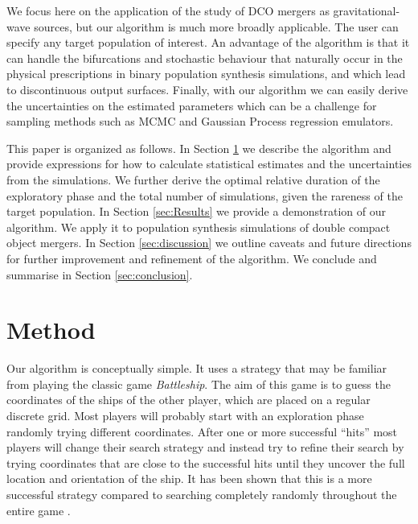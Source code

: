 \documentclass[a4paper,fleqn,usenatbib,useAMS,usedcolumn]{mnras}
\begin{document}
We focus here on the application of the study of DCO mergers as gravitational-wave sources, but our algorithm is much more broadly applicable.  The user can specify any target population of interest.  An advantage of the algorithm is  that it can handle the bifurcations and stochastic behaviour that naturally occur in the physical prescriptions in binary population synthesis simulations, and which lead to discontinuous output surfaces.   Finally, with our algorithm we can easily derive the uncertainties on the estimated parameters which can be a challenge for sampling methods such as MCMC and Gaussian Process regression emulators.

This paper is organized as follows.   In Section \ref{sec:sampling-methods} we describe the algorithm and provide expressions for how to calculate statistical estimates and the uncertainties from the simulations. We further derive the optimal relative duration of the exploratory phase and the total number of simulations, given the rareness of the target population.  In Section  \ref{sec:Results}  we provide a demonstration of our algorithm. We apply it to population synthesis simulations of double compact object mergers. 
In Section \ref{sec:discussion} we outline caveats and future directions for further improvement and refinement of the algorithm. We conclude and summarise in Section \ref{sec:conclusion}. 


\section{Method}
\label{sec:sampling-methods}
Our algorithm is conceptually simple. It uses a strategy that may be familiar from playing the classic game \textit{Battleship}. The aim of this game is to guess the coordinates of the ships of the other player, which are placed on a regular discrete grid.  Most players will probably start with an exploration phase randomly trying different coordinates.  After one or more successful ``hits'' most players will change their search strategy and instead try to refine their search by trying coordinates that are close to the successful hits until they  uncover the full location and orientation of the ship. It has been shown that this is a more successful strategy compared to searching  completely randomly throughout the entire game   \citep[e.g.][]{jones1977blindfold}.
\end{document}

